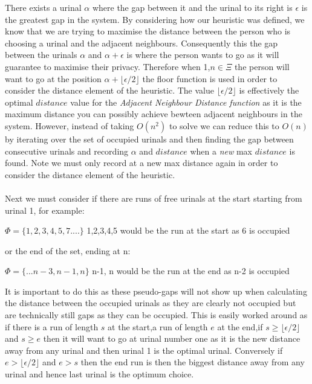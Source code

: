\documentclass{article}
\begin{document}
There exists a urinal $\alpha$ where the gap between it and the urinal to its right is $\epsilon$ is the greatest gap in the system. By considering how our heuristic was defined, we know that we are trying to maximise the distance between the person who is choosing a urinal and the adjacent neighbours. Consequently this the gap between the urinals $\alpha$ and $\alpha + \epsilon$ is where the person wants to go as it will guarantee to maximise their privacy. Therefore when 1,$ n \in \Xi$ the person will want to go at the position $\alpha + \lfloor\epsilon / 2\rfloor$ \- the floor function is used in order to consider the distance element of the heuristic. The value $\lfloor\epsilon / 2\rfloor$ is effectively the optimal $distance$ value for the \textit{Adjacent Neighbour Distance function} as it is the maximum distance you can possibly achieve bewteen adjacent neighbours in the system. However, instead of taking $O(n^2)$ to solve we can reduce this to $O(n)$ by iterating over the set of occupied urinals and then finding the gap between consecutive urinals and recording $\alpha$ and $distance$ when a \textit{new} max $distance$ is found. Note we must only record at a new max distance again in order to consider the distance element of the heuristic.\\\\
Next we must consider if there are runs of free urinals at the start starting from urinal 1, for example:\\
\begin{center}
    $\Phi = \{1,2,3,4,5,7....\}$ 1,2,3,4,5 would be the run at the start as 6 is occupied
\end{center}
or the end of the set, ending at n:\\
\begin{center}
    $\Phi = \{... n-3,n-1,n\}$ n-1, n would be the run at the end as n-2 is occupied
\end{center}
It is important to do this as these pseudo-gaps  will not show up when calculating the distance between the occupied urinals as they are clearly not occupied but are technically still gaps as they can be occupied. This is easily worked around as if there is a run of length $s$ at the start,a run of length $e$ at the end,if $s \geq \lfloor\epsilon / 2\rfloor$ and $s \geq e$ then it will want to go at urinal number one as it is the new distance away from any urinal and then urinal 1 is the optimal urinal. Conversely if $e > \lfloor\epsilon / 2\rfloor$ and $e > s$ then the end run is then the biggest distance away from any urinal and hence last urinal is the optimum choice.\\\\
\end{document}
